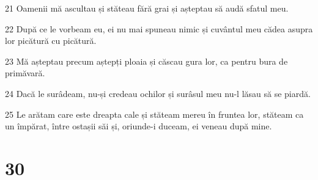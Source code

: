\par 21 Oamenii mă ascultau și stăteau fără grai și așteptau să audă sfatul meu.
\par 22 După ce le vorbeam eu, ei nu mai spuneau nimic și cuvântul meu cădea asupra lor picătură cu picătură.
\par 23 Mă așteptau precum aștepți ploaia și căscau gura lor, ca pentru bura de primăvară.
\par 24 Dacă le surâdeam, nu-și credeau ochilor și surâsul meu nu-l lăsau să se piardă.
\par 25 Le arătam care este dreapta cale și stăteam mereu în fruntea lor, stăteam ca un împărat, între ostașii săi și, oriunde-i duceam, ei veneau după mine.

\chapter{30}


